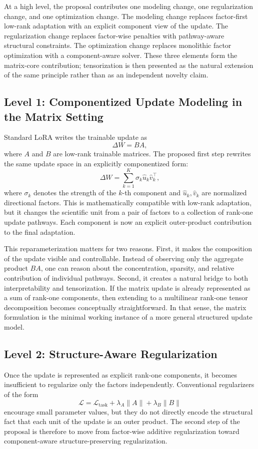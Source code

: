 \documentclass[11pt]{article}
\begin{document}
At a high level, the proposal contributes one modeling change, one regularization change, and one optimization change. The modeling change replaces factor-first low-rank adaptation with an explicit component view of the update. The regularization change replaces factor-wise penalties with pathway-aware structural constraints. The optimization change replaces monolithic factor optimization with a component-aware solver. These three elements form the matrix-core contribution; tensorization is then presented as the natural extension of the same principle rather than as an independent novelty claim.

\subsection{Level 1: Componentized Update Modeling in the Matrix Setting}

Standard LoRA writes the trainable update as
\[
\Delta W = BA,
\]
where $A$ and $B$ are low-rank trainable matrices. The proposed first step rewrites the same update space in an explicitly componentized form:
\[
\Delta W = \sum_{k=1}^{K} \sigma_k \hat{u}_k \hat{v}_k^\top,
\]
where $\sigma_k$ denotes the strength of the $k$-th component and $\hat{u}_k, \hat{v}_k$ are normalized directional factors. This is mathematically compatible with low-rank adaptation, but it changes the scientific unit from a pair of factors to a collection of rank-one update pathways. Each component is now an explicit outer-product contribution to the final adaptation.

This reparameterization matters for two reasons. First, it makes the composition of the update visible and controllable. Instead of observing only the aggregate product $BA$, one can reason about the concentration, sparsity, and relative contribution of individual pathways. Second, it creates a natural bridge to both interpretability and tensorization. If the matrix update is already represented as a sum of rank-one components, then extending to a multilinear rank-one tensor decomposition becomes conceptually straightforward. In that sense, the matrix formulation is the minimal working instance of a more general structured update model.

\subsection{Level 2: Structure-Aware Regularization}

Once the update is represented as explicit rank-one components, it becomes insufficient to regularize only the factors independently. Conventional regularizers of the form
\[
\mathcal{L} = \mathcal{L}_{\mathrm{task}} + \lambda_A \|A\| + \lambda_B \|B\|
\]
encourage small parameter values, but they do not directly encode the structural fact that each unit of the update is an outer product. The second step of the proposal is therefore to move from factor-wise additive regularization toward component-aware structure-preserving regularization.
\end{document}
